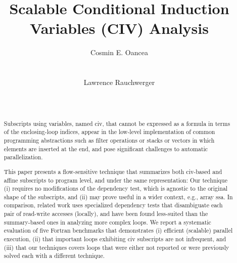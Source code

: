 \documentclass{sig-alternate}
\begin{document}


\title{Scalable Conditional Induction Variables (CIV) Analysis}   


\author{
\alignauthor
Cosmin E. Oancea\\
       \\
       \\
\alignauthor
Lawrence Rauchwerger\\
       \\
       \\
}


\maketitle



\begin{abstract}

Subscripts using variables, named {\sc civ}, that cannot be expressed 
as a formula in terms of the enclosing-loop indices,  
appear in the low-level implementation of common programming abstractions 
such as filter operations or stacks or vectors in which elements are 
inserted at the end, and pose significant challenges to automatic
parallelization.

This paper presents a flow-sensitive technique that summarizes 
both {\sc civ}-based and affine subscripts to program level,
and under the same representation: Our technique (i) requires no 
modifications of the dependency test, which is agnostic to the 
original shape of the subscripts, and (ii) may prove useful
in a wider context, e.g., array {\sc ssa}. 
%
In comparison, related work uses specialized dependency tests that 
disambiguate each pair of read-write accesses (locally), and 
have been found less-suited than the summary-based ones in analyzing 
more complex loops. 
%
We report a systematic evaluation of five Fortran benchmarks that demonstrates 
  (i) efficient (scalable) parallel execution, 
 (ii) that important loops exhibiting {\sc civ} subscripts are not infrequent, and 
(iii) that our techniques covers loops that were either not reported or were 
        previously solved each with a different technique.
\end{abstract}
\end{document}
